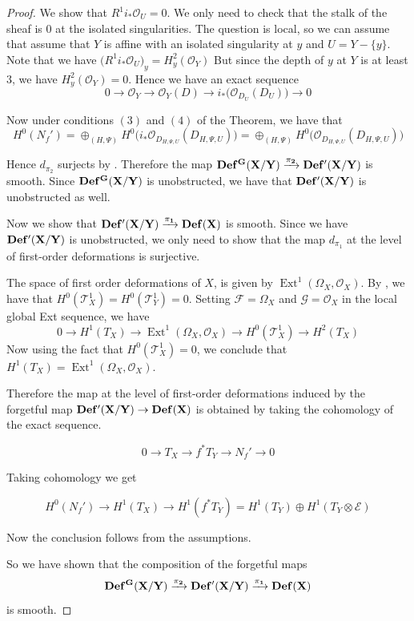 \documentclass[12pt,twoside,]{amsart}
\theoremstyle{plain}
\theoremstyle{definition}
\begin{document}
\begin{proof}
We show that $R^1i_*\mathcal{O}_U = 0$. We only need to check that the stalk of the sheaf is $0$ at the isolated singularities. The question is local, so we can assume that assume that $Y$ is affine with an isolated singularity at $y$ and $U = Y-\{y\}$. Note that we have $\big(R^1i_*\mathcal{O}_U\big)_y = H_y^2(\mathcal{O}_Y)$ 
But since the depth of $y$ at $Y$ is at least $3$, we have $H_y^2(\mathcal{O}_Y) = 0$. Hence we have an exact sequence 
\begin{equation*}
    0 \to \mathcal{O}_Y \to \mathcal{O}_Y(D) \to i_*\big(\mathcal{O}_{D_U}(D_U)\big) \to 0
\end{equation*}

Now under conditions $(3)$ and $(4)$ of the Theorem, we have that $$H^0(N_f') = \oplus_{(H,\Psi)}H^0\big(i_*\mathcal{O}_{D_{H,\Psi,U}}(D_{H,\Psi,U})\big) = \oplus_{(H,\Psi)}H^0\big(\mathcal{O}_{D_{H,\Psi,U}}(D_{H,\Psi,U})\big)$$

Hence $d_{\pi_2}$ surjects by . Therefore the map $\bf Def^G(X/Y) \xrightarrow{\pi_2} \bf Def'(X/Y)$ is smooth. Since $\bf Def^G(X/Y)$ is unobstructed, we  have that $\bf Def'(X/Y)$ is unobstructed as well.

Now we show that $\bf Def'(X/Y) \xrightarrow{\pi_1} \bf Def(X)$ is smooth. Since we have $\bf Def'(X/Y)$ is unobstructed, we only need to show that the map $d_{\pi_1}$ at the level of first-order deformations is surjective. 

The space of first order deformations of $X$, is given by $\operatorname{Ext}^1(\Omega_X, \mathcal{O}_X)$. 
By \cite[Theorem $3$]{schlessinger1971}, we have that $H^0(\mathcal{T}_X^1) = H^0(\mathcal{T}_Y^1) = 0$.
    Setting $\mathcal{F} = \Omega_X$ and $\mathcal{G} = \mathcal{O}_X$ in the local global Ext sequence, we have 
    \begin{equation}\label{not twisted local-global}
    0 \to H^1(T_X) \to \operatorname{Ext}^1(\Omega_X, \mathcal{O}_X) \to H^0(\mathcal{T}_X^1) \to H^2(T_X)
\end{equation}
Now using the fact that $H^0(\mathcal{T}_X^1) = 0$, we conclude that $H^1(T_X) = \operatorname{Ext}^1(\Omega_X, \mathcal{O}_X)$.

Therefore the map at the level of first-order deformations induced by the forgetful map $\bf Def'(X/Y) \to \bf Def(X)$ is obtained by taking the cohomology of the exact sequence.

$$0 \to T_X \to f^*T_Y \to N_f' \to 0$$


Taking cohomology we get 

$$H^0(N_f') \to H^1(T_X) \to H^1(f^*T_Y) = H^1(T_Y) \oplus H^1(T_Y \otimes \mathcal{E}) $$

Now the conclusion follows from the assumptions. 






So we have shown that the composition of the forgetful maps $$\bf Def^G(X/Y) \xrightarrow{\pi_2} \bf Def'(X/Y) \xrightarrow{\pi_1} \bf Def(X)$$ is smooth.

\end{proof}
\end{document}
